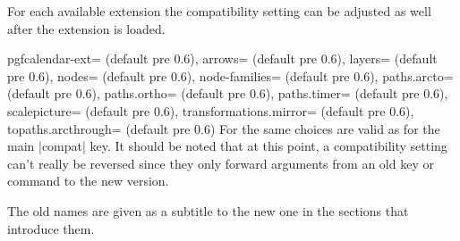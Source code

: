 \begin{multicols}{2}
\newcolumn\noindent
For each available extension the compatibility setting can be adjusted as well
after the extension is loaded.
\begin{keylist}{%
  pgfcalendar-ext= (default pre 0.6),
  arrows= (default pre 0.6),
  layers= (default pre 0.6),
  nodes= (default pre 0.6),
  node-families= (default pre 0.6),
  paths.arcto= (default pre 0.6),
  paths.ortho= (default pre 0.6),
  paths.timer= (default pre 0.6),
  scalepicture= (default pre 0.6),
  transformations.mirror= (default pre 0.6),
  topaths.arcthrough= (default pre 0.6)%
}
  For  the same choices are valid as for the main |compat| key.
  It should be noted that at this point, a compatibility setting can't really be reversed
  since they only forward arguments from an old key or command to the new version.
  
  The old names are given as a subtitle to the new one in the sections that introduce them.
\end{keylist}
\end{multicols}